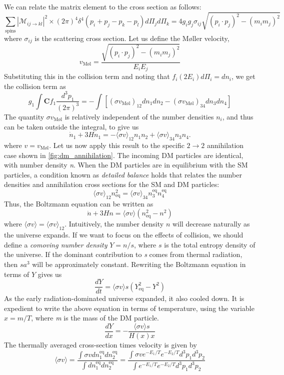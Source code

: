 We can relate the matrix element to the cross section as follows:
\[\sum_\text{spins}|\mathcal{M}_{ij\rightarrow kl}|^2\times(2\pi)^4\delta^4(p_i + p_j - p_k -p_l)d\Pi_jd\Pi_k = 4g_ig_j\sigma_{ij}\sqrt{(p_i\cdot p_j)^2 - (m_im_j)^2}\]
where $\sigma_{ij}$ is the scattering cross section. Let us define the M\o ller velocity,
\[v_\text{M\o l} = \frac{\sqrt{(p_i\cdot p_j)^2 - (m_im_j)^2}}{E_iE_j}\]
Substituting this in the collision term and noting that $f_i(2E_i)d\Pi_i = dn_i$, we get the collision term as
\[g_1\int \mathbf{C}f_1\frac{d^3p_1}{(2\pi)^3} = -\int[(\sigma v_\text{M\o l})_{12}dn_1dn_2 - (\sigma v_\text{M\o l})_{34}dn_3dn_4]\]
The quantity $\sigma v_\text{M\o l}$ is relatively independent of the number densities $n_i$, and thus can be taken outside the integral, to give us
\[\dot{n}_1 + 3Hn_1 = -\langle\sigma v\rangle_{12}n_1n_2 + \langle\sigma v\rangle_{34}n_3n_4.\]
where $v = v_\text{M\o l}$. Let us now apply this result to the specific $2\rightarrow 2$ annihilation case shown in \autoref{fig:dm_annihilation}. The incoming DM particles are identical, with number density \emph{n}. When the DM particles are in equilibrium with the SM particles, a condition known as \emph{detailed balance} holds that relates the number densities and annihilation cross sections for the SM and DM particles:
\[\langle\sigma v\rangle_{12}n^2_\text{eq}=\langle\sigma v\rangle_{34}n_3^\text{eq}n_4^\text{eq}\]
Thus, the Boltzmann equation can be written as
\[\dot{n}+3Hn = \langle\sigma v\rangle (n_\text{eq}^2 - n^2)\]
where $\langle\sigma v\rangle = \langle\sigma v\rangle_{12}$. Intuitively, the number density $n$ will decrease naturally as the universe expands. If we want to focus on the effects of collision, we should define a \emph{comoving number density} $Y = n/s$, where $s$ is the total entropy density of the universe. If the dominant contribution to \emph{s} comes from thermal radiation, then $sa^3$ will be approximately constant. Rewriting the Boltzmann equation in terms of $Y$ gives us
\[\frac{dY}{dt} = \langle\sigma v\rangle s (Y_\text{eq}^2 - Y^2)\]
As the early radiation-dominated universe expanded, it also cooled down. It is expedient to write the above equation in terms of temperature, using the variable $x = m/T$, where \emph{m} is the mass of the DM particle. 
\[\frac{dY}{dx} = -\frac{\langle\sigma v\rangle s}{H(x)x}\]
The thermally averaged cross-section times velocity is given by
\begin{equation}\label{eq:thermal_sigma_v}
  \langle\sigma v\rangle = \frac{\int\sigma vdn_1^\text{eq}dn_2^\text{eq}}{\int dn_1^\text{eq}dn_2^\text{eq}}
  =\frac{\int \sigma v e^{-E_1/T}e^{-E_2/T}d^3p_1d^3p_2}{\int e^{-E_1/T}e^{-E_2/T}d^3p_1d^3p_2}
\end{equation}
